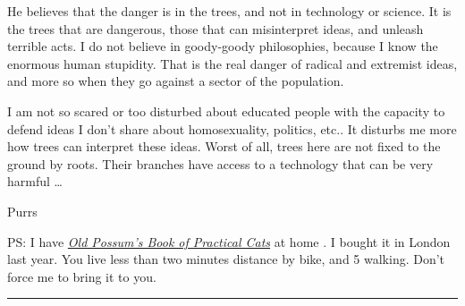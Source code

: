 \documentclass[]{book}
\begin{document}
He believes that the danger is in the trees, and not in technology or science. It is the trees that are dangerous, those that can misinterpret ideas, and unleash terrible acts. I do not believe in goody-goody philosophies, because I know the enormous human stupidity. That is the real danger of radical and extremist ideas, and more so when they go against a sector of the population.

I am not so scared or too disturbed about educated people with the capacity to defend ideas I don't share about homosexuality, politics, etc.. It disturbs me more how trees can interpret these ideas. Worst of all, trees here are not fixed to the ground by roots. Their branches have access to a technology that can be very harmful \ldots{}

Purrs

PS: I have \href{https://en.wikipedia.org/wiki/Old_Possum\%27s_Book_of_Practical_Cats}{\emph{Old Possum's Book of Practical Cats}} at home \citep{eliot2014old}. I bought it in London last year. You live less than two minutes distance by bike, and 5 walking. Don't force me to bring it to you.

\begin{center}\rule{0.5\linewidth}{\linethickness}\end{center}
\end{document}
